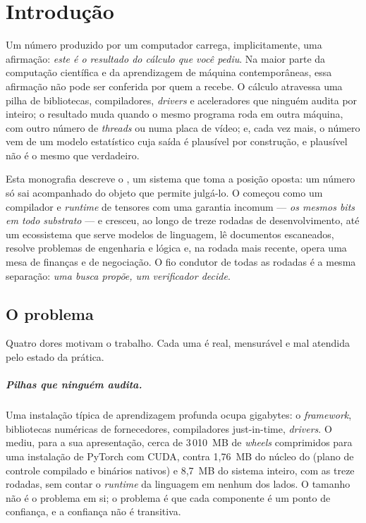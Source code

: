\chapter{Introdução}\label{cap:introducao}

Um número produzido por um computador carrega, implicitamente, uma afirmação: \emph{este é o resultado do cálculo que você pediu}. Na maior parte da computação científica e da aprendizagem de máquina contemporâneas, essa afirmação não pode ser conferida por quem a recebe. O cálculo atravessa uma pilha de bibliotecas, compiladores, \textit{drivers} e aceleradores que ninguém audita por inteiro; o resultado muda quando o mesmo programa roda em outra máquina, com outro número de \textit{threads} ou numa placa de vídeo; e, cada vez mais, o número vem de um modelo estatístico cuja saída é plausível por construção, e plausível não é o mesmo que verdadeiro.

Esta monografia descreve o \vapor{}, um sistema que toma a posição oposta: um número só sai acompanhado do objeto que permite julgá-lo. O \vapor{} começou como um compilador e \textit{runtime} de tensores com uma garantia incomum --- \emph{os mesmos bits em todo substrato} --- e cresceu, ao longo de treze rodadas de desenvolvimento, até um ecossistema que serve modelos de linguagem, lê documentos escaneados, resolve problemas de engenharia e lógica e, na rodada mais recente, opera uma mesa de finanças e de negociação. O fio condutor de todas as rodadas é a mesma separação: \emph{uma busca propõe, um verificador decide}.

\section{O problema}\label{sec:problema}

Quatro dores motivam o trabalho. Cada uma é real, mensurável e mal atendida pelo estado da prática.

\paragraph{Pilhas que ninguém audita.} Uma instalação típica de aprendizagem profunda ocupa gigabytes: o \textit{framework}, bibliotecas numéricas de fornecedores, compiladores just-in-time, \textit{drivers}. O \vapor{} mediu, para a sua apresentação, cerca de 3\,010~MB de \textit{wheels} comprimidos para uma instalação de PyTorch com CUDA, contra 1,76~MB do núcleo do \vapor{} (plano de controle compilado e binários nativos) e 8,7~MB do sistema inteiro, com as treze rodadas, sem contar o \textit{runtime} da linguagem em nenhum dos lados. O tamanho não é o problema em si; o problema é que cada componente é um ponto de confiança, e a confiança não é transitiva.

